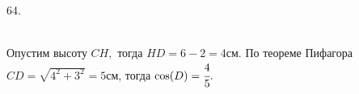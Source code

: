 64. \begin{figure}[ht!]
\end{figure}\\
Опустим высоту $CH,$ тогда $HD=6-2=4$см. По теореме Пифагора $CD=\sqrt{4^2+3^2}=5$см, тогда $\cos(D)=\cfrac{4}{5}.$\\
